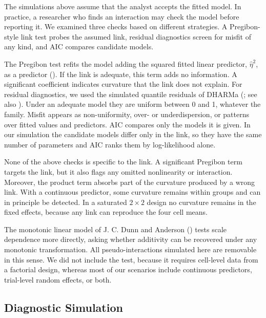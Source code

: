 \documentclass[
  man,
  floatsintext,
  longtable,
  nolmodern,
  notxfonts,
  notimes,
  colorlinks=true,linkcolor=blue,citecolor=blue,urlcolor=blue]{apa7}
\begin{document}
The simulations above assume that the analyst accepts the fitted model.
In practice, a researcher who finds an interaction may check the model
before reporting it. We examined three checks based on different
strategies. A Pregibon-style link test probes the assumed link, residual
diagnostics screen for misfit of any kind, and AIC compares candidate
models.

The Pregibon test refits the model adding the squared fitted linear
predictor, \(\hat{\eta}^2\), as a predictor
(). If the link is adequate,
this term adds no information. A significant coefficient indicates
curvature that the link does not explain. For residual diagnostics, we
used the simulated quantile residuals of DHARMa
(; see also
). Under an
adequate model they are uniform between 0 and 1, whatever the family.
Misfit appears as non-uniformity, over- or underdispersion, or patterns
over fitted values and predictors. AIC compares only the models it is
given. In our simulation the candidate models differ only in the link,
so they have the same number of parameters and AIC ranks them by
log-likelihood alone.

None of the above checks is specific to the link. A significant Pregibon
term targets the link, but it also flags any omitted nonlinearity or
interaction. Moreover, the product term absorbs part of the curvature
produced by a wrong link. With a continuous predictor, some curvature
remains within groups and can in principle be detected. In a saturated
\(2 \times 2\) design no curvature remains in the fixed effects, because
any link can reproduce the four cell means.

The monotonic linear model of J. C. Dunn and Anderson
() tests scale dependence more
directly, asking whether additivity can be recovered under any monotonic
transformation. All pseudo-interactions simulated here are removable in
this sense. We did not include the test, because it requires cell-level
data from a factorial design, whereas most of our scenarios include
continuous predictors, trial-level random effects, or both.

\subsection{Diagnostic Simulation}\label{diagnostic-simulation}
\end{document}
